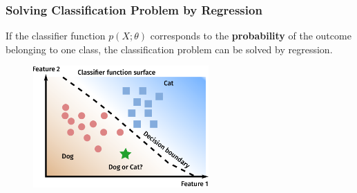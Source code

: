 \documentclass[10pt,aspectratio=169]{beamer}
\begin{document}
      \begin{frame}
        \frametitle{Solving Classification Problem by Regression}

        If the classifier function $p(X; \theta)$ corresponds to the
        \textbf{probability} of the outcome belonging to one class,
        the classification problem can be solved by regression.

        \vspace{2em}

  \begin{figure}[t]
    \vspace{-2em}
    \includegraphics[width=0.6\textwidth]{images/classification_dog_cat.pdf}
  \end{figure}
  
\end{frame}
    
\end{document}

